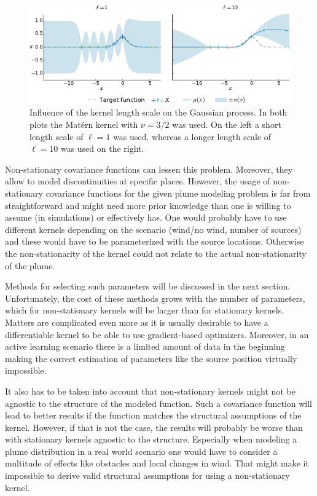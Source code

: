 \begin{figure}
    \centering
    \includegraphics{plots/gp-lengthscale}
    \caption[Length scale influence]{Influence of the kernel length scale on the 
        Gaussian process. In both plots the Mat\'ern kernel with $\nu = 3/2$ was 
        used. On the left a short length scale of $\ell = 1$ was used, whereas 
        a longer length scale of $\ell = 10$ was used on the right.
    }\label{fig:gp-length-scale}
\end{figure}

Non-stationary covariance functions can lessen this problem. Moreover, they 
allow to model discontinuities at specific places. However, the usage of 
non-stationary covariance functions for the given plume modeling problem is far 
from straightforward and might need more prior knowledge than one is willing to 
assume (in simulations) or effectively has.  One would probably have to use 
different kernels depending on the scenario (wind/no wind, number of sources) 
and these would have to be parameterized with the source locations. Otherwise 
the non-stationarity of the kernel could not relate to the actual 
non-stationarity of the plume.

Methods for selecting such parameters will be discussed in the next section.  
Unfortunately, the cost of these methods grows with the number of parameters, 
which for non-stationary kernels will be larger than for stationary kernels.  
Matters are complicated even more as it is usually desirable to have 
a differentiable kernel to be able to use gradient-based optimizers. Moreover, 
in an active learning scenario there is a limited amount of data in the 
beginning making the correct estimation of parameters like the source position 
virtually impossible.

It also has to be taken into account that non-stationary kernels might not be 
agnostic to the structure of the modeled function. Such a covariance function 
will lead to better results if the function matches the structural assumptions 
of the kernel. However, if that is not the case, the results will probably be 
worse than with stationary kernels agnostic to the structure. Especially when 
modeling a plume distribution in a real world scenario one would have to 
consider a multitude of effects like obstacles and local changes in wind.  That 
might make it impossible to derive valid structural assumptions for using 
a non-stationary kernel.

